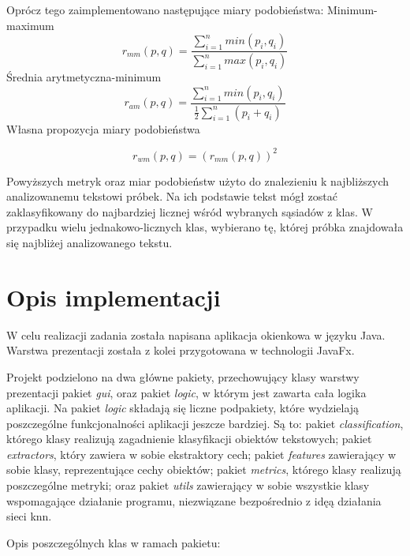 \documentclass{classrep}
\begin{document}
Oprócz tego zaimplementowano następujące miary podobieństwa: \newline
Minimum-maximum
\begin{equation}
r_{mm}(p,q) = \frac{\sum_{i=1}^{n}min(p_{i},q_{i})}{\sum_{i=1}^{n}max(p_{i},q_{i})}
\end{equation}
Średnia arytmetyczna-minimum
\begin{equation}
r_{am}(p,q) = \frac{\sum_{i=1}^{n}min(p_{i},q_{i})}{\frac{1}{2}\sum_{i=1}^{n}(p_{i}+q_{i})}
\end{equation}
Własna propozycja miary podobieństwa

\begin{equation}
r_{wm}(p,q) = (r_{mm}(p,q))^{2}
\end{equation}

Powyższych metryk oraz miar podobieństw użyto do znalezieniu k najbliższych analizowanemu tekstowi próbek. Na ich podstawie tekst mógł zostać zaklasyfikowany do najbardziej licznej wśród wybranych sąsiadów z klas. W przypadku wielu jednakowo-licznych klas, wybierano tę, której próbka znajdowała się najbliżej analizowanego tekstu.

\section{Opis implementacji}

W celu realizacji zadania została napisana aplikacja okienkowa w języku Java. Warstwa prezentacji została z kolei przygotowana w technologii JavaFx\cite{JavaFX}.

Projekt podzielono na dwa główne pakiety, przechowujący klasy warstwy prezentacji pakiet \textit{gui}, oraz pakiet \textit{logic}, w którym jest zawarta cała logika aplikacji. Na pakiet \textit{logic} składają się liczne podpakiety, które wydzielają poszczególne funkcjonalności aplikacji jeszcze bardziej. Są to: pakiet \textit{classification}, którego klasy realizują zagadnienie klasyfikacji obiektów tekstowych; pakiet \textit{extractors}, który zawiera w sobie ekstraktory cech; pakiet \textit{features} zawierający w sobie klasy, reprezentujące cechy obiektów; pakiet \textit{metrics}, którego klasy realizują poszczególne metryki; oraz pakiet \textit{utils} zawierający w sobie wszystkie klasy wspomagające działanie programu, niezwiązane bezpośrednio z idęą działania sieci knn.

Opis poszczególnych klas w ramach pakietu:
\end{document}
